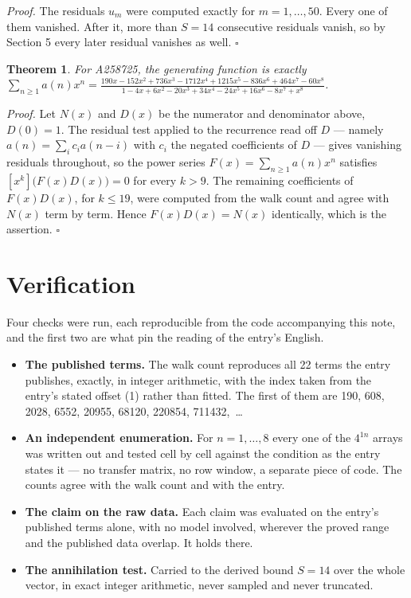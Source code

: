 \documentclass[11pt]{article}
\newtheorem{theorem}{Theorem}
\theoremstyle{definition}
\begin{document}
{\itshape Proof.} The residuals $u_m$ were computed exactly for $m = 1,\dots,50$. Every one of them vanished. After it, more than $S = 14$ consecutive residuals vanish, so by Section 5 every later residual vanishes as well. $\square$

\begin{theorem} For A258725, the generating function is exactly $\sum_{n\ge 1} a(n)x^n = \frac{190x - 152x^{2} + 736x^{3} - 1712x^{4} + 1215x^{5} - 836x^{6} + 464x^{7} - 60x^{8}}{1 - 4x + 6x^{2} - 20x^{3} + 34x^{4} - 24x^{5} + 16x^{6} - 8x^{7} + x^{8}}$.\end{theorem}

{\itshape Proof.} Let $N(x)$ and $D(x)$ be the numerator and denominator above, $D(0)=1$. The residual test applied to the recurrence read off $D$ --- namely $a(n) = \sum_i c_i a(n-i)$ with $c_i$ the negated coefficients of $D$ --- gives vanishing residuals throughout, so the power series $F(x)=\sum_{n\ge 1}a(n)x^n$ satisfies $[x^k]\bigl(F(x)D(x)\bigr) = 0$ for every $k > 9$. The remaining coefficients of $F(x)D(x)$, for $k \le 19$, were computed from the walk count and agree with $N(x)$ term by term. Hence $F(x)D(x) = N(x)$ identically, which is the assertion. $\square$

\section{Verification}

Four checks were run, each reproducible from the code accompanying this note, and the first two are what pin the reading of the entry's English.

\begin{itemize}

\item {\bfseries The published terms.} The walk count reproduces all 22 terms the entry publishes, exactly, in integer arithmetic, with the index taken from the entry's stated offset (1) rather than fitted. The first of them are 190, 608, 2028, 6552, 20955, 68120, 220854, 711432,~\dots

\item {\bfseries An independent enumeration.} For $n = 1,\dots,8$ every one of the $4^{1n}$ arrays was written out and tested cell by cell against the condition as the entry states it --- no transfer matrix, no row window, a separate piece of code. The counts agree with the walk count and with the entry.

\item {\bfseries The claim on the raw data.} Each claim was evaluated on the entry's published terms alone, with no model involved, wherever the proved range and the published data overlap. It holds there.

\item {\bfseries The annihilation test.} Carried to the derived bound $S = 14$ over the whole vector, in exact integer arithmetic, never sampled and never truncated.

\end{itemize}
\end{document}
